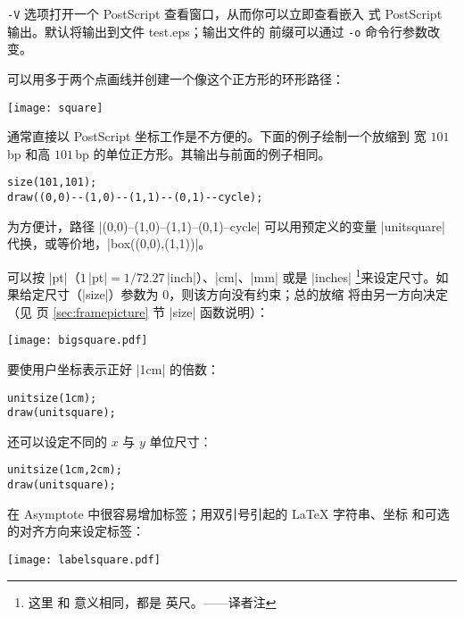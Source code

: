 \documentclass[nofonts,CJKnormalspaces]{ctexbook}[2009/05/20]
\newcommand*\prgname[1]{\textsf{#1}}
\newcommand\transnote[1]{\footnote{#1——译者注}}
\begin{document}
\verb=-V= 选项打开一个 \prgname{PostScript} 查看窗口，从而你可以立即查看嵌入
式 \prgname{PostScript} 输出。默认将输出到文件 \prgname{test.eps}；输出文件的
前缀可以通过 \verb=-o= 命令行参数改变。

可以用多于两个点画线并创建一个像这个正方形的环形路径：

\begin{center}
  \texttt{[image: square]}
\end{center}

通常直接以 \prgname{PostScript} 坐标工作是不方便的。下面的例子绘制一个放缩到
宽 $101$\,bp 和高 $101$\,bp 的单位正方形。其输出与前面的例子相同。
\begin{lstlisting}
size(101,101);
draw((0,0)--(1,0)--(1,1)--(0,1)--cycle);
\end{lstlisting}

为方便计，路径 |(0,0)--(1,0)--(1,1)--(0,1)--cycle| 可以用预定义的变量
|unitsquare| 代换，或等价地，|box((0,0),(1,1))|。

可以按 |pt|（$1$\,|pt|${}=1/72.27$\,|inch|）、|cm|、|mm| 或是 |inches|%
\transnote{这里  和  意义相同，都是
英尺。}来设定尺寸。如果给定尺寸（|size|）参数为 0，则该方向没有约束；总的放缩
将由另一方向决定（见 \pageref{sec:framepicture} 页 \ref{sec:framepicture} 节
|size| 函数说明）：

\begin{center}
  \texttt{[image: bigsquare.pdf]}
\end{center}

要使用户坐标表示正好 |1cm| 的倍数：
\begin{lstlisting}
unitsize(1cm);
draw(unitsquare);
\end{lstlisting}

还可以设定不同的 $x$ 与 $y$ 单位尺寸：
\begin{lstlisting}
unitsize(1cm,2cm);
draw(unitsquare);
\end{lstlisting}

在 \prgname{Asymptote} 中很容易增加标签；用双引号引起的 \LaTeX{} 字符串、坐标
和可选的对齐方向来设定标签：

\begin{center}
  \texttt{[image: labelsquare.pdf]}
\end{center}
\end{document}
